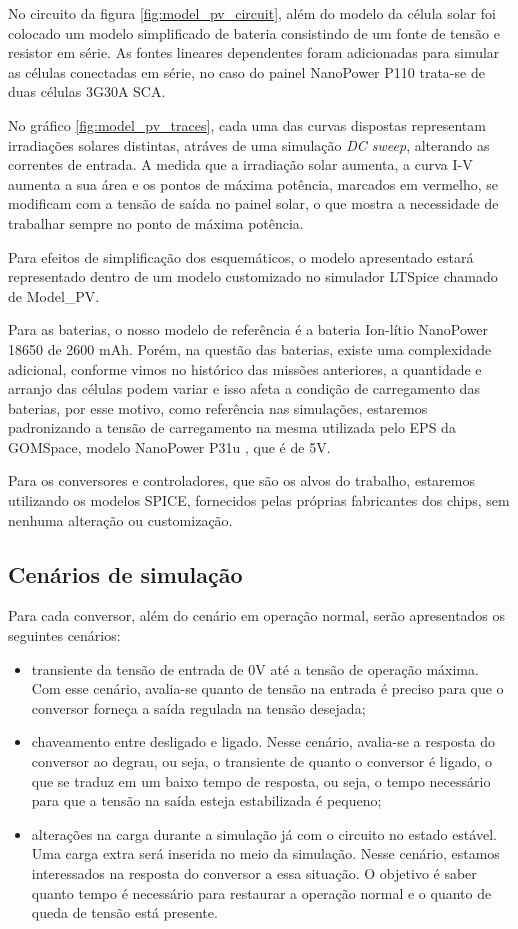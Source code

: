 No circuito da figura \ref{fig:model_pv_circuit}, além do modelo da célula solar foi colocado um modelo simplificado de bateria consistindo de um fonte de tensão e resistor em série. As fontes lineares dependentes foram adicionadas para simular as células conectadas em série, no caso do painel NanoPower P110 trata-se de duas células 3G30A SCA.

No gráfico \ref{fig:model_pv_traces}, cada uma das curvas dispostas representam irradiações solares distintas, atráves de uma simulação \textit{DC sweep}, alterando as correntes de entrada. A medida que a irradiação solar aumenta, a curva I-V aumenta a sua área e os pontos de máxima potência, marcados em vermelho, se modificam com a tensão de saída no painel solar, o que mostra a necessidade de trabalhar sempre no ponto de máxima potência.  

Para efeitos de simplificação dos esquemáticos, o modelo apresentado estará representado dentro de um modelo customizado no simulador LTSpice chamado de Model\_PV.

Para as baterias, o nosso modelo de referência \cite{battery_gomspace_datasheet} é a bateria Ion-lítio NanoPower 18650 de 2600 mAh. Porém, na questão das baterias, existe uma complexidade adicional, conforme vimos no histórico das missões anteriores, a quantidade e arranjo das células podem variar e isso afeta a condição de carregamento das baterias, por esse motivo, como referência nas simulações, estaremos padronizando a tensão de carregamento na mesma utilizada pelo EPS da GOMSpace, modelo NanoPower P31u \cite{eps_gomspace_datasheet}, que é de 5V.

Para os conversores e controladores, que são os alvos do trabalho, estaremos utilizando os modelos SPICE, fornecidos pelas próprias fabricantes dos chips, sem nenhuma alteração ou customização. 

\subsection*{Cenários de simulação}

Para cada conversor, além do cenário em operação normal, serão apresentados os seguintes cenários:
\begin{itemize}
    \item transiente da tensão de entrada de 0V até a tensão de operação máxima. Com esse cenário, avalia-se quanto de tensão na entrada é preciso para que o conversor forneça a saída regulada na tensão desejada;
    \item chaveamento entre desligado e ligado. Nesse cenário, avalia-se a resposta do conversor ao degrau, ou seja, o transiente de quanto o conversor é ligado, o que se traduz em um baixo tempo de resposta, ou seja, o tempo necessário para que a tensão na saída esteja estabilizada é pequeno;
    \item alterações na carga durante a simulação já com o circuito no estado estável. Uma carga extra será inserida no meio da simulação. Nesse cenário, estamos interessados na resposta do conversor a essa situação. O objetivo é saber quanto tempo é necessário para restaurar a operação normal e o quanto de queda de tensão está presente. 
\end{itemize}


